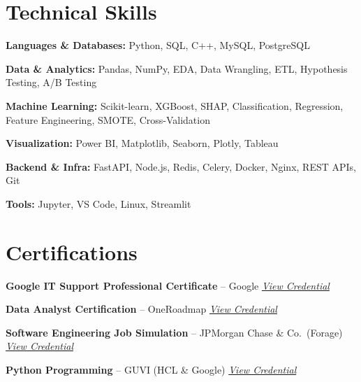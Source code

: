 \documentclass[letterpaper,10pt]{article}
\begin{document}
\section{Technical Skills}
\begin{itemize}[leftmargin=0.12in, label={}, itemsep=2pt]
\small{
  \item \textbf{Languages \& Databases:} Python, SQL, C++, MySQL, PostgreSQL
  \item \textbf{Data \& Analytics:} Pandas, NumPy, EDA, Data Wrangling, ETL, Hypothesis Testing, A/B Testing
  \item \textbf{Machine Learning:} Scikit-learn, XGBoost, SHAP, Classification, Regression, Feature Engineering, SMOTE, Cross-Validation
  \item \textbf{Visualization:} Power BI, Matplotlib, Seaborn, Plotly, Tableau
  \item \textbf{Backend \& Infra:} FastAPI, Node.js, Redis, Celery, Docker, Nginx, REST APIs, Git
  \item \textbf{Tools:} Jupyter, VS Code, Linux, Streamlit
}
\end{itemize}

\section{Certifications}
\begin{itemize}[leftmargin=0.12in, label={}, itemsep=2pt]
\small{
  \item \textbf{Google IT Support Professional Certificate} -- Google \hfill
    \href{https://www.credly.com/badges/a35a58e0-d494-45bd-b0c9-46d49ab1f160/linked_in_profile}{\textit{View Credential}}
  \item \textbf{Data Analyst Certification} -- OneRoadmap \hfill
    \href{https://www.oneroadmap.io/skills/da/certificate/CERT-A2E85530}{\textit{View Credential}}
  \item \textbf{Software Engineering Job Simulation} -- JPMorgan Chase \& Co.\ (Forage) \hfill
    \href{https://www.theforage.com/completion-certificates/Sj7temL583QAYpHXD/E6McHJDKsQYh79moz_Sj7temL583QAYpHXD_6968e9acf428cd83161a08be_1768713167805_completion_certificate.pdf}{\textit{View Credential}}
  \item \textbf{Python Programming} -- GUVI (HCL \& Google) \hfill
    \href{https://www.guvi.in/verify-certificate?id=73N51Ay181FQsf1O53}{\textit{View Credential}}
}
\end{itemize}
\end{document}

